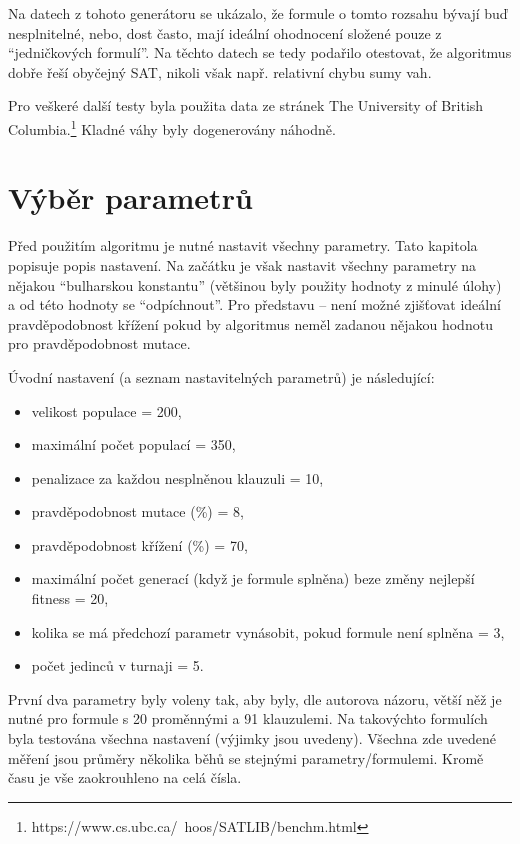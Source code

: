 \documentclass[a4paper]{article}
\begin{document}
		Na datech z tohoto generátoru se ukázalo, že formule o tomto rozsahu bývají buď nesplnitelné, nebo, dost často, mají ideální ohodnocení složené pouze z \enquote{jedničkových formulí}. Na těchto datech se tedy podařilo otestovat, že algoritmus dobře řeší obyčejný SAT, nikoli však např. relativní chybu sumy vah.
		
		Pro veškeré další testy byla použita data ze stránek The University of British Columbia.\footnote{https://www.cs.ubc.ca/~hoos/SATLIB/benchm.html} Kladné váhy byly dogenerovány náhodně.

	
\section{Výběr parametrů}
	Před použitím algoritmu je nutné nastavit všechny parametry. Tato kapitola popisuje popis nastavení. Na začátku je však nastavit všechny parametry na nějakou \enquote{bulharskou konstantu} (většinou byly použity hodnoty z minulé úlohy) a od této hodnoty se \enquote{odpíchnout}. Pro představu -- není možné zjišťovat ideální pravděpodobnost křížení pokud by algoritmus neměl zadanou nějakou hodnotu pro pravděpodobnost mutace.
	
	Úvodní nastavení (a seznam nastavitelných parametrů) je následující:
	\begin{itemize}
		\item velikost populace = 200,
		\item maximální počet populací = 350,
		\item penalizace za každou nesplněnou klauzuli = 10,
		\item pravděpodobnost mutace (\%) = 8,
		\item pravděpodobnost křížení (\%) = 70,
		\item maximální počet generací (když je formule splněna) beze změny nejlepší fitness = 20,
		\item kolika se má předchozí parametr vynásobit, pokud formule není splněna = 3,
		\item počet jedinců v turnaji = 5.
	\end{itemize}
	
	První dva parametry byly voleny tak, aby byly, dle autorova názoru, větší něž je nutné pro formule s 20 proměnnými a 91 klauzulemi. Na takovýchto formulích byla testována všechna nastavení (výjimky jsou uvedeny). Všechna zde uvedené měření jsou průměry několika běhů se stejnými parametry/formulemi. Kromě času je vše zaokrouhleno na celá čísla.
	
\end{document}
